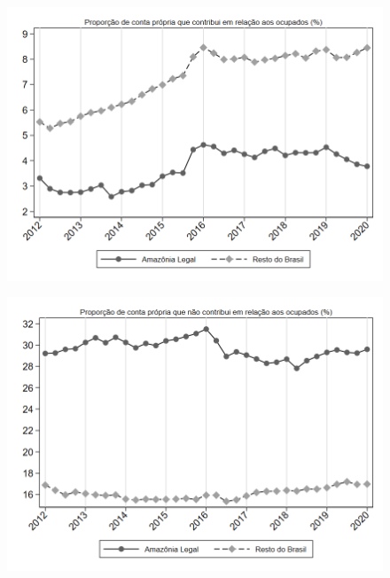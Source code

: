 \begin{frame}[label=_estrutura_emprego_prop_cpropriaC]{}
\textit{\hyperlink{_estrutura_emprego}{}}
\begin{figure}
  \centering
  \includegraphics[width=1.0\linewidth]{../../analysis/output/estrutura_emprego/_estrutura_emprego_prop_cpropriaC.png}
  \caption{}
  \label{fig:_estrutura_emprego_prop_cpropriaC}
\end{figure}
\end{frame}

\begin{frame}[label=_estrutura_emprego_prop_cpropriaNc]{}
\textit{\hyperlink{_estrutura_emprego}{}}
\begin{figure}
  \centering
  \includegraphics[width=1.0\linewidth]{../../analysis/output/estrutura_emprego/_estrutura_emprego_prop_cpropriaNc.png}
  \caption{}
  \label{fig:_estrutura_emprego_prop_cpropriaNc}
\end{figure}
\end{frame}